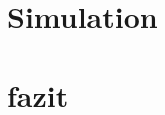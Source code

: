\begin{refsection}
	\section{Simulation}
	
	
	\section{fazit}
	
	
	


	\printbibliography[heading=subbibliography]
	\end{refsection}

